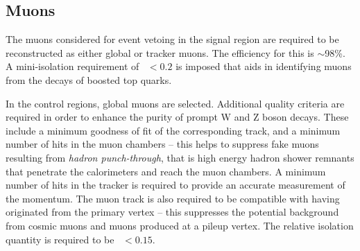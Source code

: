 \subsection*{Muons}

The muons considered for event vetoing in the signal region are required to be 
reconstructed as either global or tracker muons. The efficiency for this is 
$\sim$98\%. 
A mini-isolation requirement of 
\miniiso~$ < 0.2$ is imposed that aids in identifying muons from the decays of 
boosted top quarks.

In the control regions, global muons are selected. Additional quality criteria 
are required in order to enhance the purity of prompt W and Z boson decays. 
These include a minimum goodness of fit of the corresponding track, and a 
minimum number of hits in the muon chambers -- this helps to suppress fake 
muons resulting from \textit{hadron punch-through}, that is high energy hadron 
shower remnants that penetrate the calorimeters and reach the muon chambers. A 
minimum number of hits in the 
tracker is required to provide an accurate measurement of the momentum. The 
muon track is also required to be compatible with having originated from the 
primary vertex -- this suppresses the potential background from cosmic muons 
and muons produced at a pileup vertex. 
The relative isolation quantity is required to be \reliso~$ < 0.15$. 



